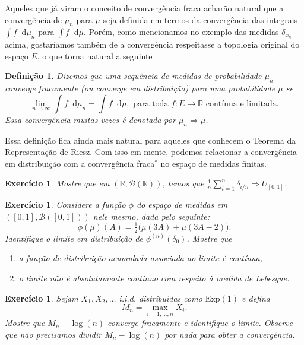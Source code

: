 \documentclass[reqno, final]{book}
\newcommand*\1{\mathds{1}}
\newtheorem{definition}[theorem]{Definição}
\newtheorem{exercise}[example]{Exercício}
\renewcommand*\d{\mathop{}\!\mathrm{d}}
\begin{document}
Aqueles que já viram o conceito de convergência fraca acharão natural que a convergência de $\mu_n$ para $\mu$ seja definida em termos da convergência das integrais $\int f \d \mu_n$ para $\int f \d \mu$.
Porém, como mencionamos no exemplo das medidas $\delta_{x_n}$ acima, gostaríamos também de a convergência respeitasse a topologia original do espaço $E$, o que torna natural a seguinte

\begin{definition}
  Dizemos que uma sequência de medidas de probabilidade $\mu_n$ converge fracamente (ou converge em distribuição) para uma probabilidade $\mu$ se 
  \begin{equation}
    \lim_{n \to \infty} \int f \d \mu_n = \int f \d \mu, \text{ para toda $f:E \to \mathbb{R}$ contínua e limitada.}
  \end{equation}
  Essa convergência muitas vezes é denotada por $\mu_n \Rightarrow \mu$.
\end{definition}

Essa definição fica ainda mais natural para aqueles que conhecem o Teorema da Representação de Riesz.
Com isso em mente, podemos relacionar a convergência em distribuição com a convergência fraca$^*$ no espaço de medidas finitas.

\begin{exercise}
  Mostre que em $(\mathbb{R}, \mathcal{B}(\mathbb{R}))$, temos que $\tfrac{1}{n} \sum_{i=1}^n \delta_{i/n} \Rightarrow U_{[0,1]}$.
\end{exercise}

\begin{exercise}
  Considere a função $\phi$ do espaço de medidas em $([0,1], \mathcal{B}([0,1]))$ nele mesmo, dada pelo seguinte:
  \begin{equation}
    \phi(\mu)(A) = \tfrac{1}{2} \big( \mu(3A) + \mu(3A - 2) \big).
  \end{equation}
  Identifique o limite em distribuição de $\phi^{(n)}(\delta_0)$.
  Mostre que
  \begin{enumerate}[\quad a)]
  \item a função de distribuição acumulada associada ao limite é contínua,
  \item o limite não é absolutamente contínuo com respeito à medida de Lebesgue.
  \end{enumerate}
\end{exercise}

\begin{exercise}
  Sejam $X_1, X_2, \dots$ i.i.d. distribuidas como $\text{Exp}(1)$ e defina
  \begin{equation}
    M_n = \max_{i = 1, \dots, n} X_i.
  \end{equation}
  Mostre que $M_n - \log(n)$ converge fracamente e identifique o limite.
  Observe que não precisamos dividir $M_n - \log(n)$ por nada para obter a convergência.
\end{exercise}
\end{document}
